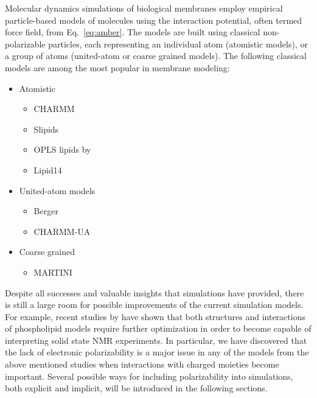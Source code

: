 Molecular dynamics simulations of biological membranes employ empirical particle-based models of molecules
using the interaction potential, often termed force field, from Eq.~\ref{eq:amber}. 
The models are built using classical non-polarizable particles, 
each representing an individual atom (atomistic models), 
or a group of atoms (united-atom or coarse grained models). 
The following classical models are among the most popular in membrane modeling:
\begin{itemize}
 \item Atomistic
 \begin{itemize}
   \item CHARMM \citep{klauda10}
   \item Slipids \citep{jambeck12, jambeck12b}
   \item OPLS lipids by \citet{maciejewski14}
   \item Lipid14 \citep{dickson14}
  \end{itemize}

 \item United-atom models
  \begin{itemize}
   \item Berger \citep{Berger97}
   \item CHARMM-UA \citep{lee14}
  \end{itemize}
 \item Coarse grained
 \begin{itemize}
   \item MARTINI \citep{marrink07}
  \end{itemize}
\end{itemize}

Despite all successes and valuable insights that simulations have provided, 
there is still a large room for possible improvements of the current simulation models. 
For example, recent studies by \citet{botan15, catte16} have shown 
that both structures and interactions of phospholipid models require further optimization 
in order to become capable of interpreting solid state NMR experiments. 
In particular, we have discovered that 
the lack of electronic polarizability is a major issue in any of the models 
from the above mentioned studies %
when interactions with charged moieties become important. 
Several possible ways for including polarizability into simulations, both explicit and implicit, 
will be introduced in the following sections. 






